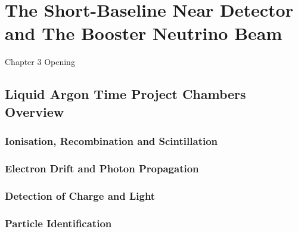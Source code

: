 \chapter{The Short-Baseline Near Detector and The Booster Neutrino Beam}

\ifpdf
    \graphicspath{{Chapter3/Figs/Raster/}{Chapter3/Figs/PDF/}{Chapter3/Figs/}}
\else
    \graphicspath{{Chapter3/Figs/Vector/}{Chapter3/Figs/}}
\fi


Chapter 3 Opening

\newpage

\section{Liquid Argon Time Project Chambers Overview}

\subsection{Ionisation, Recombination and Scintillation}

\subsection{Electron Drift and Photon Propagation}

\subsection{Detection of Charge and Light}

\subsection{Particle Identification}

